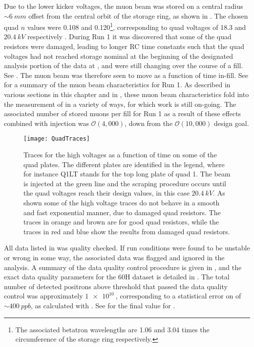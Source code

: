 Due to the lower kicker voltages, the muon beam was stored on a central radius $\sim\SI{6}{mm}$ offset from the central orbit of the storage ring, as shown in . The chosen quad $n$ values were 0.108 and 0.120\footnote{The associated betatron wavelengths are 1.06 and 3.04 times the circumference of the storage ring respectively.}, corresponding to quad voltages of 18.3 and $\SI{20.4}{kV}$ respectively \cite{tunetable}. During Run 1 it was discovered that some of the quad resistors were damaged, leading to longer RC time constants such that the quad voltages had not reached storage nominal at the beginning of the designated analysis portion of the data at , and were still changing over the course of a fill. See . The muon beam was therefore seen to move as a function of time in-fill. See  for a summary of the muon beam characteristics for Run 1. As described in various sections in this chapter and in , these muon beam characteristics fold into the measurement of \gmtwo in a variety of ways, for which work is still on-going. The associated number of stored muons per fill for Run 1 as a result of these effects combined with injection was $\mathcal{O}(4,000)$, down from the $\mathcal{O}(10,000)$ design goal. 

\begin{figure}[]
    \centering
    \texttt{[image: QuadTraces]}
    \caption[Electrostatic quadrupole high voltage traces]{Traces for the high voltages as a function of time on some of the quad plates. The different plates are identified in the legend, where for instance Q1LT stands for the top long plate of quad 1. The beam is injected at the green line and the scraping procedure occurs until the quad voltages reach their design values, in this case $\SI{20.4}{kV}$. As shown some of the high voltage traces do not behave in a smooth and fast exponential manner, due to damaged quad resistors. The traces in orange and brown are for good quad resistors, while the traces in red and blue show the results from damaged quad resistors.}
    \label{fig:QuadTraces}
\end{figure}


All data listed in  was quality checked. If run conditions were found to be unstable or wrong in some way, the associated data was flagged and ignored in the analysis. A summary of the data quality control procedure is given in , and the exact data quality parameters for the 60H dataset is detailed in . The total number of detected positrons above threshold that passed the data quality control was approximately $\SI{1e10}{}$, corresponding to a statistical error on \wa of $\sim\SI{400}{ppb}$, as calculated with . See  for the final value for \wa.




